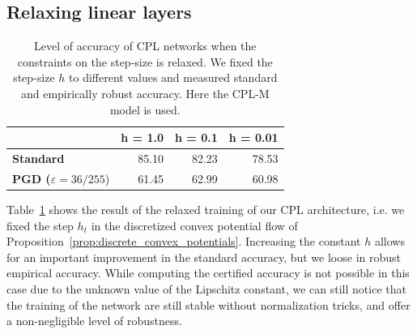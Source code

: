 \subsection{Relaxing linear layers}

\begin{table}
\begin{tabular}{lrrr}
\toprule
  & \multicolumn{1}{c}{\textbf{h = 1.0}} & \multicolumn{1}{c}{\textbf{h = 0.1}} & \multicolumn{1}{c}{\textbf{h = 0.01}} \\
\midrule
\textbf{Standard} & 85.10 & 82.23 & 78.53 \\
\textbf{PGD ($\varepsilon = 36/255$}) & 61.45 & 62.99 & 60.98 \\
\bottomrule
\end{tabular}
\caption{Level of accuracy of CPL networks when the constraints on the step-size is relaxed. We fixed the step-size $h$ to different values and measured standard and empirically robust accuracy. Here the CPL-M model is used.}
\label{table:relaxstep}
\end{table}

Table~\ref{table:relaxstep} shows the result of the relaxed training of our CPL architecture, i.e. we fixed the step $h_t$ in the discretized convex potential flow of Proposition~\ref{prop:discrete_convex_potentials}.
Increasing the constant $h$ allows for an important improvement  in the standard accuracy, but we loose in robust empirical accuracy.
While computing the certified accuracy is not possible in this case due to the unknown value of the Lipschitz constant, we can still notice that the training of the network are still stable without normalization tricks, and offer a non-negligible level of robustness. 



